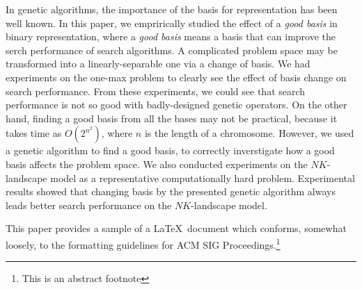 In genetic algorithms, the importance of the basis for representation has been well known.
In this paper, we emprirically studied the effect of a \textit{good basis} in binary representation, where a \textit{good basis} means a basis that can improve the serch performance of search algorithms.
A complicated problem space may be transformed into a linearly-separable one via a change of basis.
We had experiments on the one-max problem to clearly see the effect of basis change on search performance.
From these experiments, we could see that search performance is not so good with badly-designed genetic operators.
On the other hand, finding a good basis from all the bases may not be practical, because it takes time as $ O(2^{n^2}) $, where $ n $ is the length of a chromosome.
However, we used a genetic algorithm to find a good basis, to correctly inverstigate how a good basis affects the problem space.
We also conducted experiments on the $ NK $-landscape model as a representative computationally hard problem.
Experimental results showed that changing basis by the presented genetic algorithm always leads better search performance on the $ NK $-landscape model.


This paper provides a sample of a \LaTeX\ document which conforms,
somewhat loosely, to the formatting guidelines for
ACM SIG Proceedings.\footnote{This is an abstract footnote}
